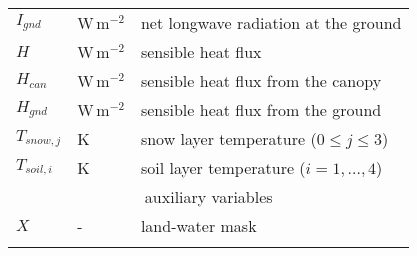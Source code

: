 \begin{table}[t]
\begin{tabular}{lll}
        $I_{gnd}$    & W\,m$^{-2}$            & net longwave radiation at the ground \\
        $H$          & W\,m$^{-2}$            & sensible heat flux \\
        $H_{can}$    & W\,m$^{-2}$            & sensible heat flux from the canopy \\
        $H_{gnd}$    & W\,m$^{-2}$            & sensible heat flux from the ground \\
        $T_{snow,j}$ & K                      & snow layer temperature ($0 \leq j \leq 3$) \\
        $T_{soil,i}$ & K                      & soil layer temperature ($i=1,\dots,4$) \\
        [1pt]
        \multicolumn{3}{c}{auxiliary variables}                                             \\
        $X$          & -                      & land-water mask \\
        \bottomhline
    \end{tabular}
\end{table}

